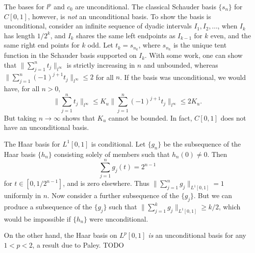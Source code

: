 \begin{example}
    The bases for $l^p$ and $c_0$ are unconditional. The classical Schauder basis $\{ s_n \}$ for $C[0,1]$, however, is \emph{not} an unconditional basis. To show the basis is unconditional, consider an infinite sequence of dyadic intervals $I_1, I_2, \dots$, when $I_k$ has length $1/2^k$, and $I_k$ shares the same left endpoints as $I_{k-1}$ for $k$ even, and the same right end points for $k$ odd. Let $t_k = s_{n_k}$, where $s_{n_k}$ is the unique tent function in the Schauder basis supported on $I_k$. With some work, one can show that $\| \sum_{j = 1}^n t_j \|_{l^\infty}$ is strictly increasing in $n$ and unbounded, whereas $\| \sum_{j = 1}^n (-1)^{j+1} t_j \|_{l^\infty} \leq 2$ for all $n$. If the basis was unconditional, we would have, for all $n > 0$,
    \[ \| \sum_{j = 1}^n t_j \|_{l^\infty} \leq K_u \| \sum_{j = 1}^n (-1)^{j+1} t_j \|_{l^\infty} \leq 2K_u. \]
    But taking $n \to \infty$ shows that $K_u$ cannot be bounded. In fact, $C[0,1]$ does not have an unconditional basis.
\end{example}

\begin{example}
    The Haar basis for $L^1[0,1]$ is conditional. Let $\{ g_n \}$ be the subsequence of the Haar basis $\{ h_n \}$ consisting solely of members such that $h_n(0) \neq 0$. Then
    \[ \sum_{j = 1}^n g_j(t) = 2^{n-1} \]
    for $t \in [0,1/2^{n-1}]$, and is zero elsewhere. Thus $\| \sum_{j = 1}^n g_j \|_{L^1[0,1]} = 1$ uniformly in $n$. Now consider a further subsequence of the $\{ g_j \}$. But we can produce a subsequence of the $\{ g_j \}$ such that $\| \sum_{j = 1}^k g_j \|_{L^1[0,1]} \geq k/2$, which would be impossible if $\{ h_n \}$ were unconditional.

    On the other hand, the Haar basis on $L^p[0,1]$ \emph{is} an unconditional basis for any $1 < p < 2$, a result due to Paley. TODO
\end{example}

